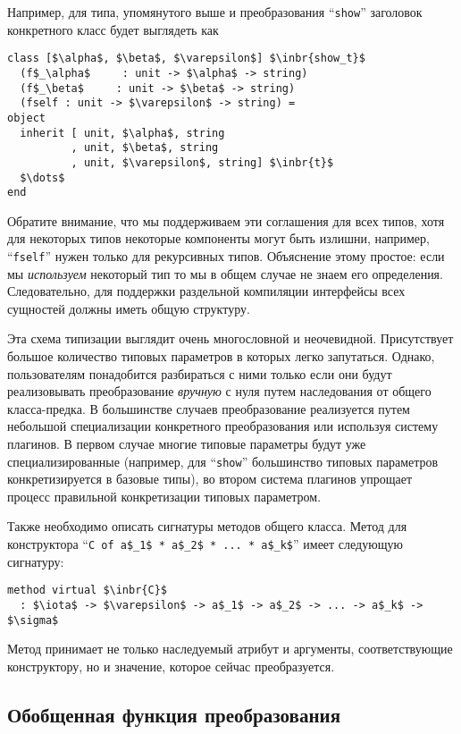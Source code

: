 \noindent Например, для типа, упомянутого выше и преобразования ``\lstinline{show}'' заголовок конкретного класс будет выглядеть как

\begin{lstlisting}
class [$\alpha$, $\beta$, $\varepsilon$] $\inbr{show_t}$ 
  (f$_\alpha$     : unit -> $\alpha$ -> string)
  (f$_\beta$     : unit -> $\beta$ -> string)
  (fself : unit -> $\varepsilon$ -> string) =
object 
  inherit [ unit, $\alpha$, string
          , unit, $\beta$, string
          , unit, $\varepsilon$, string] $\inbr{t}$
  $\dots$
end 
\end{lstlisting}

Обратите внимание, что мы поддерживаем эти соглашения для всех типов, хотя для некоторых типов некоторые компоненты могут быть излишни, например, ``\lstinline{fself}''
нужен только для рекурсивных типов. Объяснение этому простое: если мы \emph{используем} некоторый тип
то мы в общем случае не знаем его определения. Следовательно, для поддержки раздельной компиляции интерфейсы всех сущностей должны иметь общую структуру.

Эта схема типизации выглядит очень многословной и неочевидной. Присутствует большое количество типовых параметров в которых легко запутаться.
Однако, пользователям понадобится разбираться с ними только если они будут реализовывать преобразование \emph{вручную} с нуля путем 
наследования от общего класса-предка.
В большинстве случаев преобразование реализуется путем небольшой специализации конкретного преобразования или используя систему плагинов. 
В первом случае многие типовые параметры будут уже специализированные (например, для  ``\lstinline{show}'' большинство типовых параметров конкретизируется в базовые типы), во втором система плагинов упрощает процесс правильной конкретизации типовых параметром. %

Также необходимо описать сигнатуры методов общего класса. Метод для конструктора  ``\lstinline|C of a$_1$ * a$_2$ * ... * a$_k$|'' имеет следующую сигнатуру:

\begin{lstlisting}
method virtual $\inbr{C}$ 
  : $\iota$ -> $\varepsilon$ -> a$_1$ -> a$_2$ -> ... -> a$_k$ -> $\sigma$
\end{lstlisting}

\noindent Метод принимает не только наследуемый атрибут и аргументы, соответствующие конструктору, но и значение, которое сейчас преобразуется.

\subsection{Обобщенная функция преобразования}
\label{gcata}

